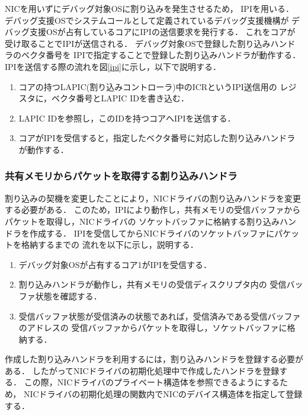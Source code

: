 \documentclass[submit,techreq,noauthor,dvipdfmx]{ipsj}
\begin{document}

NICを用いずにデバッグ対象OSに割り込みを発生させるため，
IPIを用いる．
デバッグ支援OSでシステムコールとして定義されているデバッグ支援機構が
デバッグ支援OSが占有しているコアにIPIの送信要求を発行する．
これをコアが受け取ることでIPIが送信される．
デバッグ対象OSで登録した割り込みハンドラのベクタ番号を
IPIで指定することで登録した割り込みハンドラが動作する．
IPIを送信する際の流れを図\ref{ipi}に示し，以下で説明する．

\begin{enumerate}
    \item 
        コアの持つLAPIC(割り込みコントローラ)中のICRというIPI送信用の
        レジスタに，ベクタ番号とLAPIC IDを書き込む．
    \item 
        LAPIC IDを参照し，このIDを持つコアへIPIを送信する．
    \item 
        コアがIPIを受信すると，指定したベクタ番号に対応した割り込みハンドラが動作する．
\end{enumerate}

\subsubsection*{共有メモリからパケットを取得する割り込みハンドラ}\label{sec:interrupt_handler_acquisition_packet_from_shared_memory}

割り込みの契機を変更したことにより，NICドライバの割り込みハンドラを変更する必要がある．
このため，IPIにより動作し，共有メモリの受信バッファからパケットを取得し，NICドライバの
ソケットバッファに格納する割り込みハンドラを作成する．
IPIを受信してからNICドライバのソケットバッファにパケットを格納するまでの
流れを以下に示し，説明する．
\begin{enumerate}
    \item 
        デバッグ対象OSが占有するコア1がIPIを受信する．
    \item 
        割り込みハンドラが動作し，共有メモリの受信ディスクリプタ内の
        受信バッファ状態を確認する．
    \item 
        受信バッファ状態が受信済みの状態であれば，受信済みである受信バッファのアドレスの
        受信バッファからパケットを取得し，ソケットバッファに格納する．
\end{enumerate}

作成した割り込みハンドラを利用するには，割り込みハンドラを登録する必要がある．
したがってNICドライバの初期化処理中で作成したハンドラを登録する．
この際，NICドライバのプライベート構造体を参照できるようにするため，
NICドライバの初期化処理の関数内でNICのデバイス構造体を指定して登録する．
\end{document}
